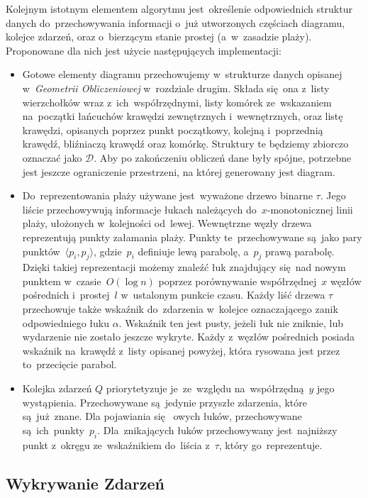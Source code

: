 \documentclass[skorowidz,autorrok,backref,xodstep,oswiadczenie]{wmimgr}
\begin{document}
Kolejnym istotnym elementem algorytmu jest~określenie odpowiednich struktur danych do~przechowywania informacji o~już utworzonych częściach diagramu, kolejce zdarzeń, oraz o~bierzącym stanie prostej (a~w~zasadzie plaży). Proponowane dla nich jest użycie następujących implementacji:
\begin{itemize}
\item
Gotowe elementy diagramu przechowujemy w~strukturze danych opisanej w~\emph{Geometrii Obliczeniowej} w~rozdziale drugim\cite{geometria}. Składa się~ona z~listy wierzchołków wraz z~ich~współrzędnymi, listy komórek ze~wskazaniem na~początki łańcuchów krawędzi zewnętrznych i~wewnętrznych, oraz listę krawędzi, opisanych poprzez punkt początkowy, kolejną i~poprzednią krawędź, bliźniaczą krawędź oraz komórkę. Struktury te będziemy zbiorczo oznaczać jako $\mathcal{D}$. Aby po zakończeniu obliczeń dane były spójne, potrzebne jest jeszcze ograniczenie przestrzeni, na której generowany jest diagram.
\item
Do~reprezentowania plaży używane jest~wyważone drzewo binarne $\tau$. Jego liście przechowywują informacje łukach należących do~$x$-monotonicznej linii plaży, ułożonych w~kolejności od~lewej. Wewnętrzne węzły drzewa reprezentują punkty załamania plaży. Punkty te~przechowywane są~jako pary punktów~$\langle p_{i}, p_{j}\rangle$, gdzie~$p_{i}$ definiuje lewą parabolę, a~$p_{j}$ prawą parabolę. Dzięki takiej reprezentacji możemy znaleźć łuk znajdujący się~nad nowym punktem w~czasie~$O(\log{n})$ poprzez porównywanie współrzędnej~$x$ węzłów pośrednich i~prostej~$l$ w~ustalonym punkcie czasu.
Każdy liść drzewa $\tau$ przechowuje także wskaźnik do~zdarzenia w~kolejce oznaczającego zanik odpowiedniego łuku $\alpha$. Wskaźnik ten jest pusty, jeżeli łuk nie zniknie, lub wydarzenie nie zostało jeszcze wykryte. Każdy z~węzłów pośrednich posiada wskaźnik na~krawędź z~listy opisanej powyżej, która rysowana jest przez to~przecięcie parabol.
\item
Kolejka zdarzeń $Q$ priorytetyzuje je~ze~względu na~współrzędną~$y$ jego wystąpienia. Przechowywane są~jedynie przyszłe zdarzenia, które są~już~znane. Dla pojawiania się ~owych łuków, przechowywane są~ich~punkty~$p_{i}$. Dla~znikających łuków przechowywany jest~najniższy punkt z~okręgu ze~wskaźnikiem do~liścia z~$\tau$, który go~reprezentuje.
\end{itemize}

\subsection{Wykrywanie Zdarzeń}
\end{document}
